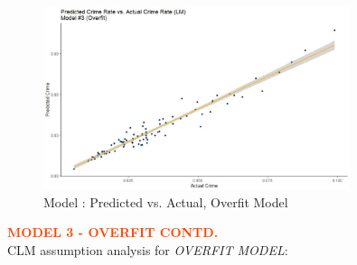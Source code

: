 \begin{figure}[!ht]
	\centering
	\includegraphics[width=0.8\textwidth]{images/Model_3_performance.jpg}
	\caption{Model : Predicted vs. Actual, Overfit Model}
	\label{fig:Model3 Performance}
\end{figure}

\pagebreak

\textbf{\textcolor{OrangeRed}{MODEL 3 - OVERFIT CONTD.}}\\

CLM assumption analysis for \textit{OVERFIT MODEL}:\\
\label{sec:OverfitModelCLM}

